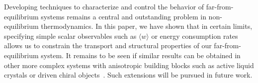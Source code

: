 \documentclass[pre, superscriptaddress, twocolumn,pre]{revtex4-1}
\begin{document}
Developing techniques to characterize and control the behavior of far-from- equilibrium systems remains a central and outstanding problem in non-equilibrium thermodynamics. In this paper, we have shown that in certain limits, specifying simple scalar observables such as $\langle w \rangle$ or energy consumption rates allows us to constrain the transport and structural properties of our far-from-equilibrium system. It remains to be seen if similar results can be obtained in other more complex systems with anisotropic building blocks such as active liquid crystals or driven chiral objects~\cite{Joshi2017,vanZuiden2016,Nguyen2014b}. Such extensions will be pursued in future work.  






\end{document}
